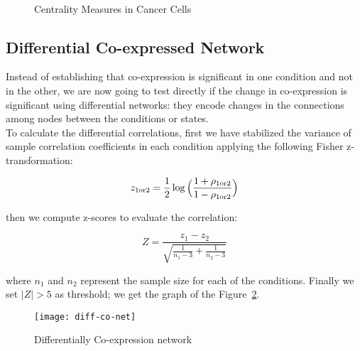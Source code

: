 \documentclass[
10pt, %
a4paper, %
oneside, %
headinclude,footinclude, %
BCOR5mm, %
]{scrartcl}
\begin{document}
\begin{figure}[H]
\centering
{} \quad
{} \\
 \quad
{}
\caption[Centrality Measures Co-Net in cancer cells]{Centrality Measures in Cancer Cells} %
\label{fig:7}
\end{figure}



\subsection{Differential Co-expressed Network}
Instead of establishing that co-expression is significant in one condition and not in the other, we are now going to test directly if the change in co-expression is significant using differential networks: they encode changes in the connections among nodes between the conditions or states.\\

To calculate the differential correlations, first we have stabilized the variance  of sample correlation coefficients in each condition applying the following Fisher z-transformation:

$$
z_{1 \text{or} 2} = \frac{1}{2}\log{\Bigl(\frac{1+\rho_{1 \text{or} 2}}{1-\rho_{1 \text{or} 2}}\Bigr)}
$$

then we compute z-scores to evaluate the correlation:

$$
Z = \frac{z_1 - z_2}{\sqrt{\frac{1}{n_1 - 3}+\frac{1}{n_2 - 3}}}
$$

where $n_1$ and $n_2$ represent the sample size for each of the conditions. Finally we set $|Z|> 5$ as threshold; we get the graph of the Figure~\ref{fig:8}.
\begin{figure}[H]
\centering 
\texttt{[image: diff-co-net]} 
\caption[Differentially Co-expression network]{Differentially Co-expression network} %
\label{fig:8} 
\end{figure}
\end{document}
